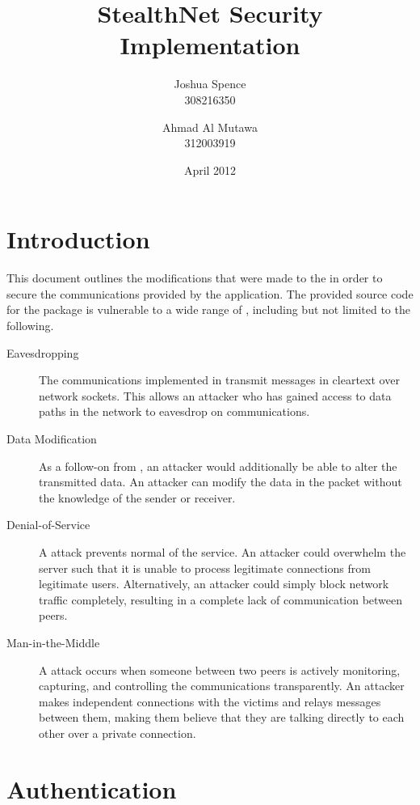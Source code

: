 \documentclass[a4paper,11pt]{article}
\title{StealthNet Security Implementation}
\author{Joshua Spence \\ 308216350 \and Ahmad Al Mutawa \\ 312003919}
\date{April 2012}
\begin{document}
\maketitle

\section{Introduction}
This document outlines the modifications that were made to the \packageName{} in
order to secure the communications provided by the application. The provided
source code for the \packageName{} package is vulnerable to a wide range of 
, including but not limited to the following.

\begin{description}

\item[Eavesdropping] The communications implemented in \packageName{} transmit
messages in cleartext over network sockets. This allows an attacker who has 
gained access to data paths in the network to eavesdrop on \packageName{} 
communications.

\item[Data Modification] As a follow-on from , an 
attacker would additionally be able to alter the transmitted data. An attacker
can modify the data in the packet without the knowledge of the sender or 
receiver.

\item[Denial-of-Service] A  attack prevents normal
of the \serviceName{} service. An attacker could overwhelm the \serviceName{} 
server such that it is unable to process legitimate connections from legitimate 
users. Alternatively, an attacker could simply block network traffic completely,
resulting in a complete lack of communication between \serviceName{} peers.

\item[Man-in-the-Middle] A  attack occurs when 
someone between two \serviceName{} peers is actively monitoring, capturing, and 
controlling the communications transparently. An attacker makes independent 
connections with the victims and relays messages between them, making them 
believe that they are talking directly to each other over a private connection.

\end{description}

\section{Authentication}
\end{document}
